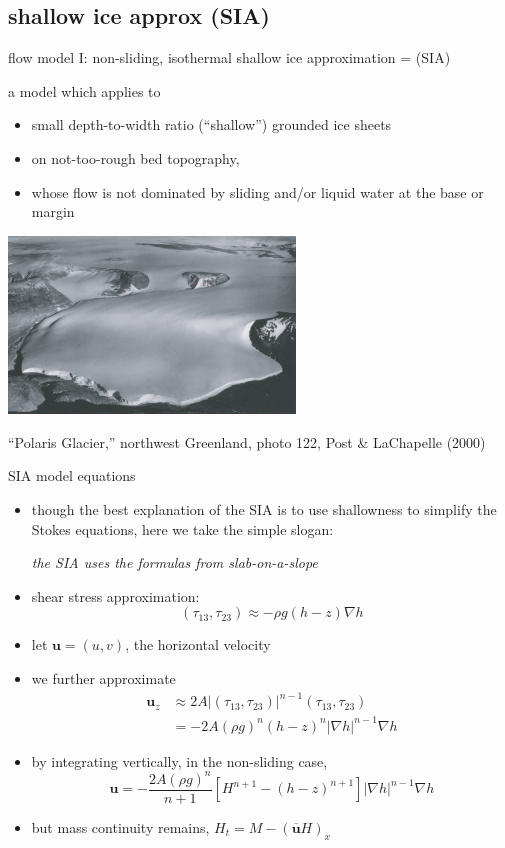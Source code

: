 \documentclass[titlepage,letterpaper,final,11pt]{scrartcl}
\begin{document}
\subsection{shallow ice approx (SIA)}

flow model I: non-sliding, isothermal shallow ice approximation = (SIA)

a model which applies to
\begin{itemize}
\item small depth-to-width ratio (``shallow'') grounded ice sheets
\item on not-too-rough bed topography,
\item whose flow is not dominated by sliding and/or liquid water at the base or margin
\end{itemize}

\begin{center}
  \includegraphics[width=3.0in]{polaris}

``Polaris Glacier,'' northwest Greenland, photo 122, Post \& LaChapelle (2000)\nocite{PostLaChapelle}
\end{center}

SIA model equations

\begin{itemize}
\item though the best explanation of the SIA is to use shallowness to simplify the Stokes equations, here we take the simple slogan:

\begin{center}
\emph{the SIA uses the formulas from slab-on-a-slope}
\end{center}
\item shear stress approximation:
	$$(\tau_{13},\tau_{23}) \approx - \rho g (h-z) \nabla h$$
\item let $\mathbf{u} = (u,v)$, the horizontal velocity
\item we further approximate
\begin{align*}
\mathbf{u}_z &\approx 2 A |(\tau_{13},\tau_{23})|^{n-1} (\tau_{13},\tau_{23}) \\
     &= - 2 A (\rho g)^n (h-z)^n |\nabla h|^{n-1} \nabla h
\end{align*}
\item by integrating vertically, in the non-sliding case,
    $$\mathbf{u} = - \frac{2 A (\rho g)^n}{n+1} \left[H^{n+1} - (h-z)^{n+1}\right] |\nabla h|^{n-1} \nabla h$$
\item but mass continuity remains, $H_t = M - \left(\overline{\mathbf{u}} H\right)_x$
\end{itemize}
\end{document}
